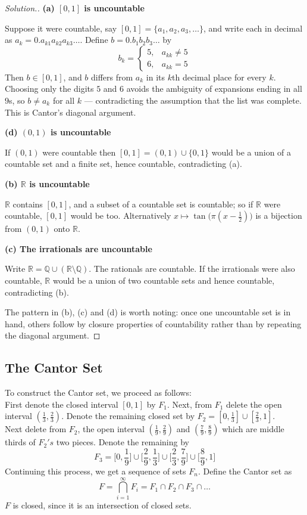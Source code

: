 \documentclass[11pt,a4paper]{article}
\theoremstyle{definition}
\newenvironment{solution}
  {\renewcommand{\qedsymbol}{}\begin{proof}[\textit{Solution}.]}
  {\end{proof}}
\newcommand{\subhead}[1]{%
  \par\medskip\noindent\textbf{#1}\par\nobreak\smallskip}
\begin{document}
\begin{solution}
\subhead{(a) $[0,1]$ is uncountable}
Suppose it were countable, say $[0,1]=\{a_1,a_2,a_3,\dots\}$, and write each in
decimal as $a_k=0.a_{k1}a_{k2}a_{k3}\dots$. Define $b=0.b_1b_2b_3\dots$ by
$$b_k=\begin{cases}5,& a_{kk}\neq 5\\ 6,& a_{kk}=5\end{cases}$$
Then $b\in[0,1]$, and $b$ differs from $a_k$ in its $k$th decimal place for
every $k$. Choosing only the digits $5$ and $6$ avoids the ambiguity of
expansions ending in all $9$s, so $b\neq a_k$ for all $k$ --- contradicting the
assumption that the list was complete. This is Cantor's diagonal argument.

\subhead{(d) $(0,1)$ is uncountable}
If $(0,1)$ were countable then $[0,1]=(0,1)\cup\{0,1\}$ would be a union of a
countable set and a finite set, hence countable, contradicting (a).

\subhead{(b) $\mathbb{R}$ is uncountable}
$\mathbb{R}$ contains $[0,1]$, and a subset of a countable set is countable; so
if $\mathbb{R}$ were countable, $[0,1]$ would be too. Alternatively
$x\mapsto\tan\big(\pi(x-\frac12)\big)$ is a bijection from $(0,1)$ onto
$\mathbb{R}$.

\subhead{(c) The irrationals are uncountable}
Write $\mathbb{R}=\mathbb{Q}\cup(\mathbb{R}\setminus\mathbb{Q})$. The rationals
are countable. If the irrationals were also countable, $\mathbb{R}$ would be a
union of two countable sets and hence countable, contradicting (b).

The pattern in (b), (c) and (d) is worth noting: once one uncountable set is in
hand, others follow by closure properties of countability rather than by
repeating the diagonal argument.
\end{solution}


\subsection{The Cantor Set}
To construct the Cantor set, we proceed as follows:\\ First denote the closed interval $[0,1]$ by $F_1$. Next, from $F_1$ delete the open interval $(\frac{1}{3},\frac{2}{3})$. Denote the remaining closed set by $F_2=[0,\frac{1}{3}]\cup [\frac{2}{3},1]$.\\ Next delete from $F_2$, the open interval $(\frac{1}{9},\frac{2}{9})$ and $(\frac{7}{9},\frac{8}{9})$ which are middle thirds of $F_2's$ two pieces. Denote the remaining by $$F_3=\Big[0,\frac{1}{9}\Big]\cup \Big[\frac{2}{9},\frac{1}{3}\Big]\cup \Big[\frac{2}{3},\frac{7}{9}\Big]\cup \Big[\frac{8}{9},1\Big]$$ Continuing this process, we get a sequence of sets $F_n$. Define the Cantor set as $$F=\bigcap^{\infty}_{i=1}F_i=F_1\cap F_2\cap F_3\cap\dots$$ $F$ is closed, since it is an intersection of closed sets.\\\\
\end{document}
